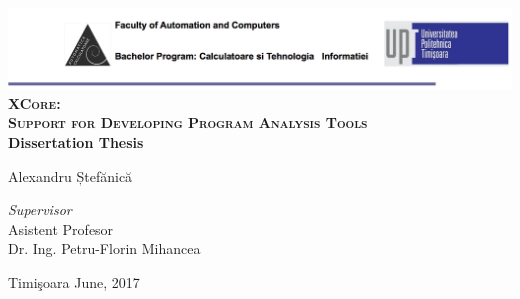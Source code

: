 \begin{titlepage}
	\begin{center}	
		\includegraphics[width=\textwidth]{../img/header.png}\\[4cm]
		
		{\huge \bfseries \textsc{XCore:\vspace{2.5mm}\\ Support for 
Developing Program\vspace{2.5mm} Analysis Tools}}
		\\[3cm]
		
		{\bfseries Dissertation Thesis} \\[3cm]
								
		\begin{flushright}
				\large Alexandru Ștefănică \\[1cm]
		\end{flushright}
		\begin{flushleft}
			 \large
				\emph{Supervisor} \\
				Asistent Profesor \\
				Dr. Ing. Petru-Florin Mihancea \\[1cm]
		\end{flushleft}
		
		{\large {Timi\c{s}oara June, 2017}}
	\end{center}
\end{titlepage}
